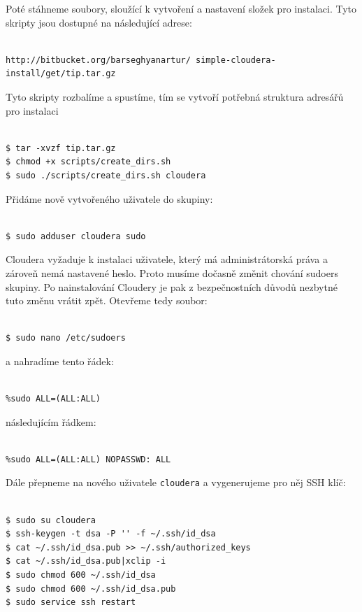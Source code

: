 \documentclass[thesis=M,czech]{FITthesis}[2012/06/26]
\begin{document}
\pagebreak
Poté stáhneme soubory, sloužící k vytvoření a nastavení složek pro instalaci. Tyto skripty jsou dostupné na následující adrese:
\begin{lstlisting}[frame=single]  % Start your code-block

http://bitbucket.org/barseghyanartur/ simple-cloudera-install/get/tip.tar.gz
\end{lstlisting} 

Tyto skripty rozbalíme a spustíme, tím se vytvoří potřebná struktura adresářů pro instalaci
\begin{lstlisting}[frame=single]  % Start your code-block

$ tar -xvzf tip.tar.gz
$ chmod +x scripts/create_dirs.sh
$ sudo ./scripts/create_dirs.sh cloudera
\end{lstlisting} 

Přidáme nově vytvořeného uživatele do skupiny:
\begin{lstlisting}[frame=single]  % Start your code-block

$ sudo adduser cloudera sudo
\end{lstlisting}

Cloudera vyžaduje k instalaci uživatele, který má administrátorská práva a zároveň nemá nastavené heslo. Proto musíme dočasně změnit chování sudoers skupiny. Po nainstalování Cloudery je pak z bezpečnostních důvodů nezbytné tuto změnu vrátit zpět. Otevřeme tedy soubor:

\begin{lstlisting}[frame=single]  % Start your code-block

$ sudo nano /etc/sudoers
\end{lstlisting}
a nahradíme tento řádek:
\begin{lstlisting}[frame=single]  % Start your code-block

%sudo ALL=(ALL:ALL)
\end{lstlisting}
následujícím řádkem:
\begin{lstlisting}[frame=single]  % Start your code-block

%sudo ALL=(ALL:ALL) NOPASSWD: ALL
\end{lstlisting}

Dále přepneme na nového uživatele \texttt{cloudera} a  vygenerujeme pro něj SSH klíč:
\begin{lstlisting}[frame=single]  % Start your code-block

$ sudo su cloudera
$ ssh-keygen -t dsa -P '' -f ~/.ssh/id_dsa
$ cat ~/.ssh/id_dsa.pub >> ~/.ssh/authorized_keys
$ cat ~/.ssh/id_dsa.pub|xclip -i
$ sudo chmod 600 ~/.ssh/id_dsa
$ sudo chmod 600 ~/.ssh/id_dsa.pub
$ sudo service ssh restart
\end{lstlisting}
\end{document}

